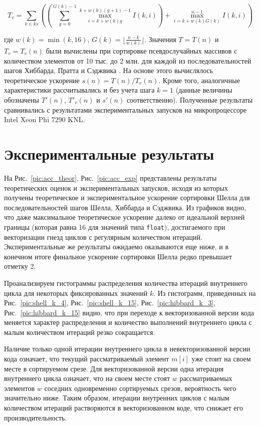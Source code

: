 \documentclass[utf8]{psta}
\begin{document}
\begin{equation}
T_v = \sum_{k \in ks}
{
\left(
\left(
\sum_{g = 0}^{G(k) - 1}{\max_{i = k + w(k)g}^{k + w(k)(g + 1) - 1}{I(k, i)}}
\right)
+ \max_{i = k + w(k)G(k)}^{n - 1}{I(k, i)}
\right)
}
\end{equation}

где $w(k) = \min(k, 16)$, $G(k) = \lfloor \frac{n - k}{w(k)} \rfloor$. 
Значения $T = T(n)$ и $T_v = T_v(n)$ были вычислены при сортировке псевдослучайных массивов с количеством элементов от 10 тыс. до 2 млн. для каждой из последовательностей шагов Хиббарда, Пратта и Сэджвика \cite{Pratt_seq,Hib_seq,Sedjw_seq}. 
На основе этого вычислялось теоретическое ускорение $s(n) = T(n)/T_v(n)$. 
Кроме того, аналогичные характеристики рассчитывались и без учета шага $k = 1$ (данные величины обозначены $T'(n)$, $T'_v(n)$ и $s'(n)$ соответственно). 
Полученные результаты сравнивались с результатами экспериментальных запусков на микропроцессоре Intel Xeon Phi 7290 KNL.

\section{Экспериментальные результаты}
 
На Рис.~\ref{pic:acc_theor}, Рис.~\ref{pic:acc_exp} представлены результаты теоретических оценок и экспериментальных запусков, исходя из которых получены теоретическое и экспериментальное ускорение сортировки Шелла для последовательностей шагов Шелла, Хиббарда и Сэджвика. 
Из графиков видно, что даже максимальное теоретическое ускорение далеко от идеальной верхней границы (которая равна 16 для значений типа \texttt{float}), достигаемого при векторизации гнезд циклов с регулярным количеством итераций. 
Экспериментальные же результаты ожидаемо оказываются еще ниже, и в конечном итоге финальное ускорение сортировки Шелла редко превышает отметку 2.

Проанализируем гистограммы распределения количества итераций внутреннего цикла для некоторых фиксированных значений $k$. 
Из гистограмм, приведенных на Рис.~\ref{pic:shell_k_4}, Рис.~\ref{pic:shell_k_15}, Рис.~\ref{pic:hibbard_k_3}, Рис.~\ref{pic:hibbard_k_15} видно, что при переходе к векторизованной версии кода меняется характер распределения и количество выполнений внутреннего цикла с малым количеством итераций резко сокращается.

Наличие только одной итерации внутреннего цикла в невекторизованной версии кода означает, что текущий рассматриваемый элемент $m[i]$ уже стоит на своем месте в сортируемом срезе.
Для векторизованной версии одна итерация внутреннего цикла означает, что на своем месте стоят $w$ рассматриваемых элементов $w$ соседних одновременно сортируемых срезов, вероятность чего значительно ниже. 
Таким образом, итерации внутренних циклов с малым количеством итераций растворяются в векторизованном коде, что снижает его производительность.
\end{document}
